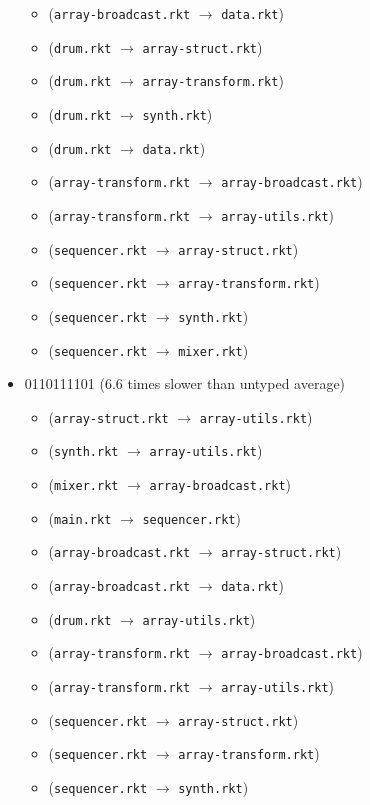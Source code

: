 \documentclass{article}
\newcommand{\mono}[1]{\texttt{#1}}
\begin{document}
\begin{itemize}
\begin{itemize}
  \item (\mono{array-broadcast.rkt} $\rightarrow$ \mono{data.rkt})
  \item (\mono{drum.rkt} $\rightarrow$ \mono{array-struct.rkt})
  \item (\mono{drum.rkt} $\rightarrow$ \mono{array-transform.rkt})
  \item (\mono{drum.rkt} $\rightarrow$ \mono{synth.rkt})
  \item (\mono{drum.rkt} $\rightarrow$ \mono{data.rkt})
  \item (\mono{array-transform.rkt} $\rightarrow$ \mono{array-broadcast.rkt})
  \item (\mono{array-transform.rkt} $\rightarrow$ \mono{array-utils.rkt})
  \item (\mono{sequencer.rkt} $\rightarrow$ \mono{array-struct.rkt})
  \item (\mono{sequencer.rkt} $\rightarrow$ \mono{array-transform.rkt})
  \item (\mono{sequencer.rkt} $\rightarrow$ \mono{synth.rkt})
  \item (\mono{sequencer.rkt} $\rightarrow$ \mono{mixer.rkt})
  \end{itemize}
\item 0110111101 (6.6 times slower than untyped average)
  \begin{itemize}
  \item (\mono{array-struct.rkt} $\rightarrow$ \mono{array-utils.rkt})
  \item (\mono{synth.rkt} $\rightarrow$ \mono{array-utils.rkt})
  \item (\mono{mixer.rkt} $\rightarrow$ \mono{array-broadcast.rkt})
  \item (\mono{main.rkt} $\rightarrow$ \mono{sequencer.rkt})
  \item (\mono{array-broadcast.rkt} $\rightarrow$ \mono{array-struct.rkt})
  \item (\mono{array-broadcast.rkt} $\rightarrow$ \mono{data.rkt})
  \item (\mono{drum.rkt} $\rightarrow$ \mono{array-utils.rkt})
  \item (\mono{array-transform.rkt} $\rightarrow$ \mono{array-broadcast.rkt})
  \item (\mono{array-transform.rkt} $\rightarrow$ \mono{array-utils.rkt})
  \item (\mono{sequencer.rkt} $\rightarrow$ \mono{array-struct.rkt})
  \item (\mono{sequencer.rkt} $\rightarrow$ \mono{array-transform.rkt})
  \item (\mono{sequencer.rkt} $\rightarrow$ \mono{synth.rkt})

\end{itemize}
\end{itemize}
\end{document}
